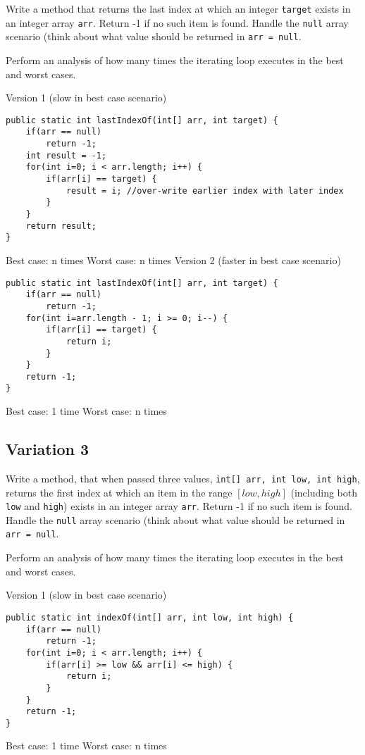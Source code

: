 \begin{exercise}
Write a method that returns the last index at which an integer \texttt{target} exists in an integer array \texttt{arr}. Return -1 if no such item is found. Handle the \texttt{null} array scenario (think about what value should be returned in \texttt{arr = null}.

Perform an analysis of how many times the iterating loop executes in the best and worst cases.
\end{exercise}
\begin{answer}
Version 1 (slow in best case scenario)
\begin{lstlisting}
public static int lastIndexOf(int[] arr, int target) {
	if(arr == null)
		return -1;
	int result = -1;
	for(int i=0; i < arr.length; i++) {
		if(arr[i] == target) {
			result = i; //over-write earlier index with later index
		}
	}
	return result;
}
\end{lstlisting}	
Best case: n times
Worst case: n times
\vskip 1cm
Version 2 (faster in best case scenario)
\begin{lstlisting}
public static int lastIndexOf(int[] arr, int target) {
	if(arr == null)
		return -1;
	for(int i=arr.length - 1; i >= 0; i--) {
		if(arr[i] == target) {
			return i;
		}
	}
	return -1;
}
\end{lstlisting}	
Best case: 1 time
Worst case: n times
\end{answer}

\subsection{Variation 3}

\begin{exercise}
Write a method, that when passed three values, \texttt{int[] arr, int low, int high}, returns the first index at which an item in the range $[low, high]$ (including both \texttt{low} and \texttt{high}) exists in an integer array \texttt{arr}. Return -1 if no such item is found. Handle the \texttt{null} array scenario (think about what value should be returned in \texttt{arr = null}.

Perform an analysis of how many times the iterating loop executes in the best and worst cases.
\end{exercise}
\begin{answer}
Version 1 (slow in best case scenario)
\begin{lstlisting}
public static int indexOf(int[] arr, int low, int high) {
	if(arr == null)
		return -1;
	for(int i=0; i < arr.length; i++) {
		if(arr[i] >= low && arr[i] <= high) {
			return i;
		}
	}
	return -1;
}
\end{lstlisting}	
Best case: 1 time
Worst case: n times
\end{answer}

